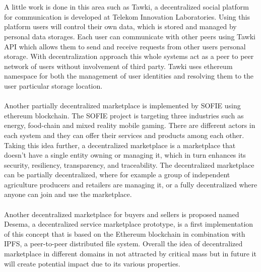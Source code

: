 \\
\\
A little work is done in this area such as Tawki, a decentralized social platform for communication is developed at Telekom Innovation Laboratories. Using this platform users will control their own data, which is stored and managed by personal data storages\cite{westerkamp2019tawki}. Each user can communicate with other peers using Tawki API which allows them to send and receive requests from other users personal storage. With decentralization approach this whole systems act as a peer to peer network of users without involvement of third party. Tawki uses ethereum namespace for both the management of user identities and resolving them to the user particular storage location.\cite{westerkamp2019tawki} 
\\
\\
Another partially decentralized marketplace is implemented by SOFIE using ethereum blockchain. The SOFIE project is targeting three industries such as energy, food-chain and mixed reality mobile gaming.\cite{WEBSITE:2} There are different actors in each system and they can offer their services and products among each other. Taking this idea further, a decentralized marketplace is a marketplace that doesn't have a single entity owning or managing it, which in turn enhances its security, resiliency, transparency, and traceability. The decentralized marketplace can be partially decentralized, where for example a group of independent agriculture producers and retailers are managing it, or a fully decentralized where anyone can join and use the marketplace.
\\
\\
Another decentralized marketplace for buyers and sellers is proposed named Desema, a decentralized service marketplace prototype, is a first implementation of this concept that is based on the Ethereum blockchain in combination with IPFS, a peer-to-peer distributed file system. Overall the idea of decentralized marketplace in different domains in not attracted by critical mass but in future it will create potential impact due to its various properties.\cite{Klems2017TrustlessII}
